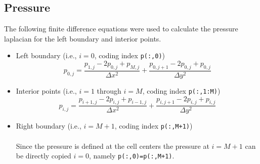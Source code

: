 \subsection{Pressure}
The following finite difference equations were used to calculate the
pressure laplacian for the left boundary and interior points. 

\begin{itemize}
    \item Left boundary (i.e., $i=0$, coding index \texttt{p(:,0)})
        \begin{equation}
            p_{0,j} =   \frac{
                            p_{1,j} - 2p_{0,j} + p_{M,j}
                            }{\Delta x^{2}}
                            +
                        \frac{
                            p_{0,j+1} - 2p_{0,j} + p_{0,j}
                            }{\Delta y^{2}}
        \end{equation}
    \item Interior points (i.e., $i=1$ through $i=M$, coding index
        \texttt{p(:,1:M)})
        \begin{equation}
            p_{i,j} =   \frac{
                            p_{i+1,j} - 2p_{i,j} + p_{i-1,j}
                            }{\Delta x^{2}}
                            +
                        \frac{
                            p_{i,j+1} - 2p_{i,j} + p_{i,j}
                            }{\Delta y^{2}}
        \end{equation}
    \item Right boundary (i.e., $i=M+1$, coding index \texttt{p(:,M+1)}) \\
        \\
        Since the pressure is defined at the cell centers the pressure at 
        $i=M+1$ can be directly copied $i=0$, namely
        \texttt{p(:,0)=p(:,M+1)}.
\end{itemize}
            
